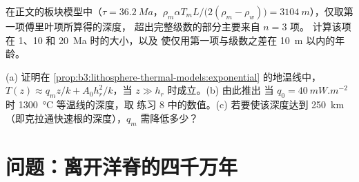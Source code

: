 \begin{exercise}[$\star\star\star$]\label{exo:b3:lithosphere-thermal-models:11}
在正文的板块模型中（$\tau = \qty{36.2}{Ma}$，$\rho_m\alpha T_mL/
\bigl(2(\rho_m - \rho_w)\bigr) = \qty{3104}{m}$），仅取第一项傅里叶项所算得的深度，
超出完整级数的部分主要来自 $n = 3$ 项。
计算该项在 1、10 和 \qty{20}{Ma} 时的大小，以及
使仅用第一项与级数之差在 \qty{10}{m} 以内的年龄。
\end{exercise}

\begin{exercise}[$\star\star\star$]\label{exo:b3:lithosphere-thermal-models:12}
(a) 证明在 \cref{prop:b3:lithosphere-thermal-models:exponential} 的地温线中，
$T(z) \approx q_mz/k + A_0h_r^2/k$，当 $z \gg h_r$ 时成立。(b) 由此推出
当 $q_0 = \qty{40}{mW.m^{-2}}$ 时 \qty{1300}{\celsius} 等温线的深度，取
练习 8 中的数值。(c) 若要使该深度达到
\qty{250}{km}（即克拉通快速根的深度），$q_m$ 需降低多少？
\end{exercise}

\section{问题：离开洋脊的四千万年}

